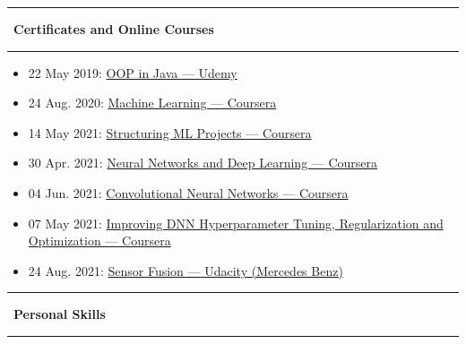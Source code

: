 \documentclass[10pt,a4paper]{article}
\newcommand{\sectionline}[1]{%
  \vspace{0.5em}
  \begin{center}
    \textcolor{title_color}{\rule[0.5ex]{0.25\linewidth}{0.5pt}}
    ~{\LARGE \bfseries \textcolor{title_color}{\cambria #1}}~
    \textcolor{title_color}{\rule[0.5ex]{0.25\linewidth}{0.5pt}}
  \end{center}
  \vspace{0.05em}
}
\begin{document}
\sectionline{Certificates and Online Courses}
\begin{itemize}[leftmargin=*]
  \item 22 May 2019: \href{https://www.udemy.com/certificate/UC-XN2ILPOB/}{OOP in Java — Udemy}
  \item 24 Aug. 2020: \href{https://coursera.org/share/e32b80d8e0b32b48e4ad6fe40cea746e}{Machine Learning — Coursera}
  \item 14 May 2021: \href{https://coursera.org/share/15d74342746d2872a09dcc5a75ff460c}{Structuring ML Projects — Coursera}
  \item 30 Apr. 2021: \href{https://coursera.org/share/0ca157f56b99f56122ab247589555837}{Neural Networks and Deep Learning — Coursera}
  \item 04 Jun. 2021: \href{https://coursera.org/share/e0bd7b6ea301e1108dfe609c783f2706}{Convolutional Neural Networks — Coursera}
  \item 07 May 2021: \href{https://coursera.org/share/ef6671ff524b9d2e5c1e0e282d457f56}{Improving DNN Hyperparameter Tuning, Regularization and Optimization — Coursera}
  \item 24 Aug. 2021: \href{http://www.udacity.com/certificate/e/95ce8498-c21f-11eb-aa1a-5f098308d726}{Sensor Fusion — Udacity (Mercedes Benz)}
\end{itemize}


\vspace{2em}
\sectionline{Personal Skills}
\end{document}
